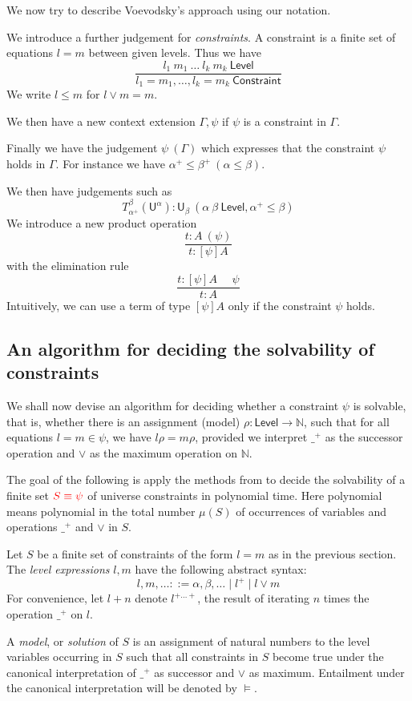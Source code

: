 \documentclass[11pt,a4paper]{article}
\def\UU{\mathsf{U}}
\def\Level{\mathsf{Level}}
\def\Constraint{\mathsf{Constraint}}
\begin{document}
We now try to describe Voevodsky's approach \cite{VV} using our notation.

We introduce a further judgement for {\em constraints}. A constraint is
a finite set of equations $l = m$ between given levels. Thus we have
$$
\frac{l_1~m_1~\dots~l_k~m_k~\Level}{l_1 = m_1,\dots,l_k = m_k~\Constraint}
$$
We write $l\leqslant m$ for $l\vee m = m$.

We then have a new context extension $\Gamma,\psi$ if $\psi$ is a constraint in $\Gamma$.

Finally we have the judgement $\psi~(\Gamma)$ which expresses that the constraint $\psi$
holds in $\Gamma$. For instance we have $\alpha^+\leqslant\beta^+~(\alpha\leqslant\beta)$.

We then have judgements such as
$$
T_{\alpha^+}^{\beta}(\UU^{\alpha}):\UU_{\beta}~(\alpha~\beta~\Level,\alpha^+\leqslant\beta)
$$
We introduce a new product operation
$$
\frac{t:A~(\psi)}{t:[\psi]A}
$$
with the elimination rule
$$
\frac{t:[\psi]A~~~~~~\psi}{t:A}
$$
Intuitively, we can use a term of type $[\psi]A$ only if the constraint $\psi$ holds.

\subsection{An algorithm for deciding the solvability of constraints}

We shall now devise an algorithm for deciding whether a constraint $\psi$ is solvable, that is, whether there is an assignment (model) $\rho : \Level \to \mathbb{N}$, such that for all equations $l = m \in \psi$, we have $l\rho = m\rho$, provided we interpret $\_^+$ as the successor operation and $\vee$ as the maximum operation on $\mathbb{N}$.

The goal of the following is apply the methods from \cite{BNR08} to decide
the solvability of a finite set $\color{red} S\equiv\psi$ of universe constraints in polynomial time.
Here polynomial means polynomial in the total number $\mu(S)$ of occurrences of
variables and operations $\_^+$ and $\vee$ in $S$.

Let $S$ be a finite set of constraints of the form $l=m$ as in the previous section.
The \emph{level expressions} $l,m$ have the following abstract syntax:
\[
l,m,\ldots ::= {\alpha,\beta,\ldots} \mid {l^+} \mid {l\vee m}
\]
For convenience, let $l+n$ denote $l^{+\ldots +}$, the result of iterating $n$ times
the operation $\_^+$ on $l$.

A \emph{model}, or \emph{solution} of $S$ is an assignment of natural numbers to
the level variables occurring in $S$ such that all constraints in $S$ become true
under the canonical interpretation of $\_^+$ as successor and $\vee$ as maximum.
Entailment under the canonical interpretation will be denoted by $\models$.
\end{document}
